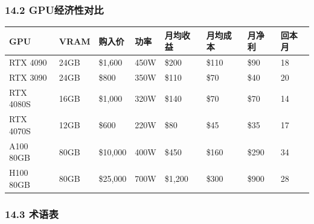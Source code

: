 \documentclass[UTF8,a4paper,12pt]{ctexart}
\begin{document}
\subsubsection{14.2
GPU经济性对比}\label{gpuux7ecfux6d4eux6027ux5bf9ux6bd4}

{\def\LTcaptype{none} %
\begin{longtable}[]{@{}llllllll@{}}
\toprule\noalign{}
GPU & VRAM & 购入价 & 功率 & 月均收益 & 月均成本 & 月净利 & 回本月 \\
\midrule\noalign{}
\endhead
\bottomrule\noalign{}
\endlastfoot
RTX 4090 & 24GB & \$1,600 & 450W & \$200 & \$110 & \$90 & 18 \\
RTX 3090 & 24GB & \$800 & 350W & \$110 & \$70 & \$40 & 20 \\
RTX 4080S & 16GB & \$1,000 & 320W & \$140 & \$70 & \$70 & 14 \\
RTX 4070S & 12GB & \$600 & 220W & \$80 & \$45 & \$35 & 17 \\
A100 80GB & 80GB & \$10,000 & 400W & \$450 & \$160 & \$290 & 34 \\
H100 80GB & 80GB & \$25,000 & 700W & \$1,200 & \$300 & \$900 & 28 \\
\end{longtable}
}

\subsubsection{14.3 术语表}\label{ux672fux8bedux8868}
\end{document}
